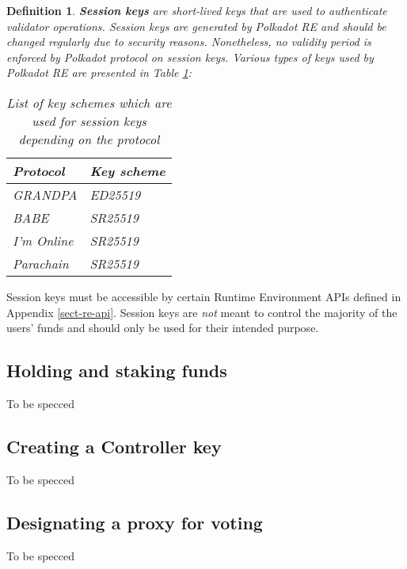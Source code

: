 \documentclass{book}
\newcommand{\tmem}[1]{{\em #1\/}}
\newcommand{\tmstrong}[1]{\textbf{#1}}
\newcommand{\tmtextbf}[1]{{\bfseries{#1}}}
\newcommand{\tmtextit}[1]{{\itshape{#1}}}
\newtheorem{definition}{Definition}
\providecommand{\tmem}[1]{\tmtextit{#1}}
\providecommand{\tmstrong}[1]{\tmtextbf{#1}}
\providecommand{\tmtextbf}[1]{\tmtextbf{#1}}
\providecommand{\tmtextit}[1]{\tmtextit{#1}}
\newtheorem{definition}{Definition}
\begin{document}
\begin{definition}
  \label{defn-session-key}{\tmstrong{Session keys}} are short-lived keys that
  are used to authenticate validator operations. Session keys are generated by
  Polkadot RE and should be changed regularly due to security reasons.
  Nonetheless, no validity period is enforced by Polkadot protocol on session
  keys. Various types of keys used by Polkadot RE are presented in Table
  \ref{tabl-session-keys}{\tmem{:}}
  
  \begin{table}[h]
    \begin{tabular}{ll}
      \hline
      Protocol & Key scheme\\
      \hline
      GRANDPA & ED25519\\
      BABE & SR25519\\
      I'm Online & SR25519\\
      Parachain & SR25519\\
      \hline
    \end{tabular}
    \caption{\label{tabl-session-keys}List of key schemes which are used for
    session keys depending on the protocol}
  \end{table}
\end{definition}

Session keys must be accessible by certain Runtime Environment APIs defined in
Appendix \ref{sect-re-api}. Session keys are {\tmem{not}} meant to control the
majority of the users' funds and should only be used for their intended
purpose. {}

\subsection{Holding and staking funds}\label{sect-staking-funds}

To be specced

\subsection{Creating a Controller key}\label{sect-creating-controller-key}

To be specced

\subsection{Designating a proxy for voting}\label{sect-designating-proxy}

To be specced
\end{document}
